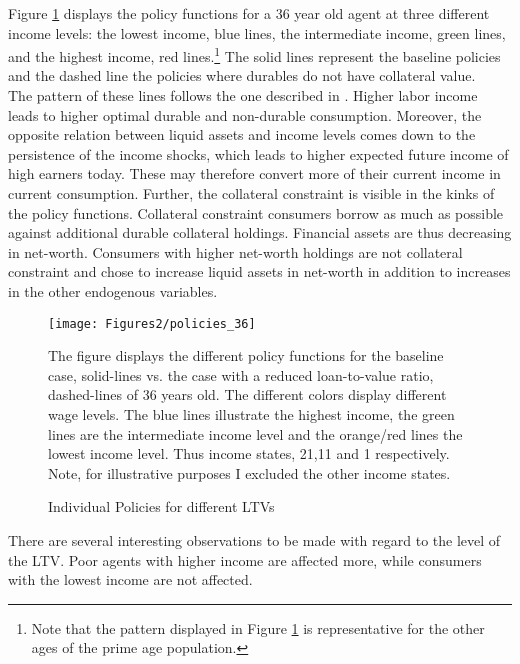 \documentclass[a4paper,12pt,legno]{article}
\begin{document}
Figure \ref{policy_downpayment0_age36} displays the policy functions for a 36 year old agent at three different income levels: the lowest income, blue lines, the intermediate income, green lines, and the highest income, red lines.\footnote{Note that the pattern displayed in Figure \ref{policy_downpayment0_age36} is representative for the other ages of the prime age population.} The solid lines represent the baseline policies and the dashed line the policies where durables do not have collateral value.\\ 
The pattern of these lines follows the one described in \cite{hintermaier2010}. Higher labor income leads to higher optimal durable and non-durable consumption. Moreover, the opposite relation between liquid assets and income levels comes down to the persistence of the income shocks, which leads to higher expected future income of high earners today. These may therefore convert more of their current income in current consumption. Further, the collateral constraint is visible in the kinks of the policy functions. Collateral constraint consumers borrow as much as possible against additional durable collateral holdings. Financial assets are thus decreasing in net-worth. Consumers with higher net-worth holdings are not collateral constraint and chose to increase liquid assets in net-worth in addition to increases in the other endogenous variables.
\begin{figure}[!htbp]
\caption{Individual Policies for different LTVs} 
\label{policy_downpayment0_age36}	%
\centering
\texttt{[image: Figures2/policies\_36]}  %

\begin{minipage}{0.8\linewidth}
\footnotesize{The figure displays the different policy functions for the baseline case, solid-lines vs. the case with a reduced loan-to-value ratio, dashed-lines of 36 years old. The different colors display different wage levels. The blue lines illustrate the highest income, the green lines are the intermediate income level and the orange/red lines the lowest income level. Thus income states, 21,11 and 1 respectively. Note, for illustrative purposes I excluded the other income states.}
\end{minipage}

\end{figure}
There are several interesting observations to be made with regard to the level of the LTV. Poor agents with higher income are affected more, while consumers with the lowest income are not affected.
\end{document}

